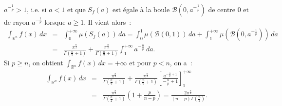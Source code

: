 {\begin{enumerate}
{$a^{-\frac{1}{p}}>1$, i.e. si $a<1$ et que $S_{f}(a)$ est \'egale
\`a la boule $\mathcal{B}(0, a^{-\frac{1}{p}})$ de centre 0 et de
rayon $a^{-\frac{1}{p}}$ lorsque $a\geq 1$. Il vient alors~:
\begin{eqnarray*}
\int_{\mathbb{R}^{n}} f(x)\,dx &=& \int_{0}^{+\infty}
\mu\left(S_{f}(a)\right)\,da = \int_{0}^{1}
\mu\left(\mathcal{B}(0,1) \right)\,da + \int_{1}^{+\infty}
\mu\left(\mathcal{B}(0, a^{-\frac{1}{p}})\right)\,da\\
& = & \frac{\pi^{\frac{n}{2}}}{\Gamma\left(\frac{n}{2}+1\right)} +
\frac{\pi^{\frac{n}{2}}}{\Gamma\left(\frac{n}{2}+1\right)}\int_{1}^{+\infty}
a^{-\frac{n}{p}}\,da.
\end{eqnarray*}
Si $p\geq n$, on obtient $\int_{\mathbb{R}^{n}} f(x)\,dx =+\infty$
et pour $p<n$, on a~:
\begin{eqnarray*}
\int_{\mathbb{R}^{n}} f(x)\,dx & =
&\frac{\pi^{\frac{n}{2}}}{\Gamma\left(\frac{n}{2}+1\right)} +
\frac{\pi^{\frac{n}{2}}}{\Gamma\left(\frac{n}{2}+1\right)}\left[\frac{a^{-\frac{n}{p}+1}}{-\frac{n}{p}+1}\right]_{1}^{+\infty}\\
&=&\frac{\pi^{\frac{n}{2}}}{\Gamma\left(\frac{n}{2}+1\right)}\left(1
+ \frac{p}{n-p} \right) = \frac{2\pi^{\frac{n}{2}}}{(n -
p)\Gamma\left(\frac{n}{2}\right)}.
\end{eqnarray*}}
\end{enumerate}
}
